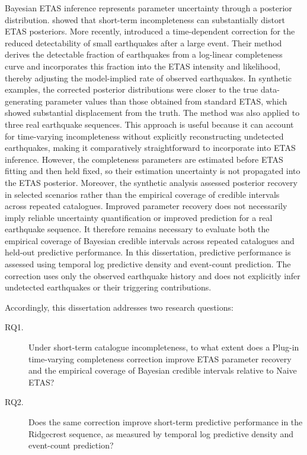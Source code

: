 \documentclass{statsmsc}
\begin{document}
Bayesian ETAS inference represents parameter uncertainty through a posterior
distribution. \citet{naylor2023} showed that short-term incompleteness can
substantially distort ETAS posteriors. More recently,
\citet{kamranzad2025} introduced a time-dependent correction for the reduced
detectability of small earthquakes after a large event. Their method derives
the detectable fraction of earthquakes from a log-linear completeness curve
and incorporates this fraction into the ETAS intensity and likelihood, thereby
adjusting the model-implied rate of observed earthquakes. In synthetic
examples, the corrected posterior distributions were closer to the true
data-generating parameter values than those obtained from standard ETAS, which
showed substantial displacement from the truth. The method was also applied
to three real earthquake sequences. This approach is useful because it can
account for time-varying incompleteness without explicitly reconstructing
undetected earthquakes, making it comparatively straightforward to incorporate
into ETAS inference. However, the completeness parameters are estimated before
ETAS fitting and then held fixed, so their estimation uncertainty is not
propagated into the ETAS posterior. Moreover, the synthetic analysis assessed
posterior recovery in selected scenarios rather than the empirical coverage of
credible intervals across repeated catalogues.
Improved parameter recovery does not necessarily imply reliable uncertainty
quantification or improved prediction for a real earthquake sequence. It
therefore remains necessary to evaluate both the empirical coverage of
Bayesian credible intervals across repeated catalogues and held-out predictive
performance. In this dissertation, predictive performance is assessed using
temporal log predictive density and event-count prediction. The correction
uses only the observed earthquake history and does not explicitly infer
undetected earthquakes or their triggering contributions.

Accordingly, this dissertation addresses two research questions:
\begin{description}
  \item[RQ1.] Under short-term catalogue incompleteness, to what extent does
  a Plug-in time-varying completeness correction improve ETAS parameter
  recovery and the empirical coverage of Bayesian credible intervals relative
  to Naive ETAS?
  \item[RQ2.] Does the same correction improve short-term predictive
  performance in the Ridgecrest sequence, as measured by temporal log
  predictive density and event-count prediction?
\end{description}
\end{document}
